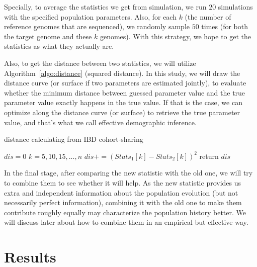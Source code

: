 \documentclass{bioinfo}
\begin{document}
\begin{methods}
Specially, to average the statistics we get from simulation, we run $20$ simulations with the specified population parameters. Also, for each $k$ (the number of reference genomes that are sequenced), we randomly sample $50$ times (for both the target genome and these $k$ genomes). With this strategy, we hope to get the statistics as what they actually are.

Also, to get the distance between two statistics, we will utilize Algorithm~\ref{algo:distance} (squared distance). In this study, we will draw the distance curve (or surface if two parameters are estimated jointly), to evaluate whether the minimum distance between guessed parameter value and the true parameter value exactly happens in the true value. If that is the case, we can optimize along the distance curve (or surface) to retrieve the true parameter value, and that's what we call effective demographic inference.

\begin{algorithm}
\caption{distance calculating from IBD cohort-sharing}
\label{algo:distance}
\vspace{-0.32cm}  %
\begin{codebox}
\li	$dis = 0$
\li	\For $k=5,10,15,...,n$
\li	\Do	$dis += (Stats_1[k] - Stats_2[k])^2$
	\End
\li	return $dis$
\end{codebox}
\vspace{-0.35cm}  %
\end{algorithm}

In the final stage, after comparing the new statistic with the old one, we will try to combine them to see whether it will help. As the new statistic provides us extra and independent information about the population evolution (but not necessarily perfect information), combining it with the old one to make them contribute roughly equally may characterize the population history better. We will discuss later about how to combine them in an empirical but effective way.



\end{methods}

\section{Results}
\end{document}
